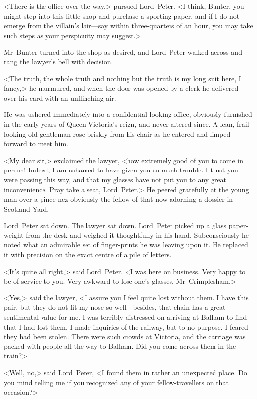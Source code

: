 <There is the office over the way,> pursued Lord~Peter. <I think, Bunter, you might step into this little shop and purchase a sporting paper, and if I do not emerge from the villain's lair—say within three-quarters of an hour, you may take such steps as your perspicuity may suggest.>

Mr~Bunter turned into the shop as desired, and Lord~Peter walked across and rang the lawyer's bell with decision.

<The truth, the whole truth and nothing but the truth is my long suit here, I fancy,> he murmured, and when the door was opened by a clerk he delivered over his card with an unflinching air.

He was ushered immediately into a confidential-looking office, obviously furnished in the early years of Queen Victoria's reign, and never altered since. A lean, frail-looking old gentleman rose briskly from his chair as he entered and limped forward to meet him.

<My dear sir,> exclaimed the lawyer, <how extremely good of you to come in person! Indeed, I am ashamed to have given you so much trouble. I trust you were passing this way, and that my glasses have not put you to any great inconvenience. Pray take a seat, Lord~Peter.> He peered gratefully at the young man over a pince-nez obviously the fellow of that now adorning a dossier in Scotland Yard.

Lord~Peter sat down. The lawyer sat down. Lord~Peter picked up a glass paper-weight from the desk and weighed it thoughtfully in his hand. Subconsciously he noted what an admirable set of finger-prints he was leaving upon it. He replaced it with precision on the exact centre of a pile of letters.

<It's quite all right,> said Lord~Peter. <I was here on business. Very happy to be of service to you. Very awkward to lose one's glasses, Mr~Crimplesham.>

<Yes,> said the lawyer, <I assure you I feel quite lost without them. I have this pair, but they do not fit my nose so well—besides, that chain has a great sentimental value for me. I was terribly distressed on arriving at Balham to find that I had lost them. I made inquiries of the railway, but to no purpose. I feared they had been stolen. There were such crowds at Victoria, and the carriage was packed with people all the way to Balham. Did you come across them in the train?>

<Well, no,> said Lord~Peter, <I found them in rather an unexpected place. Do you mind telling me if you recognized any of your fellow-travellers on that occasion?>

